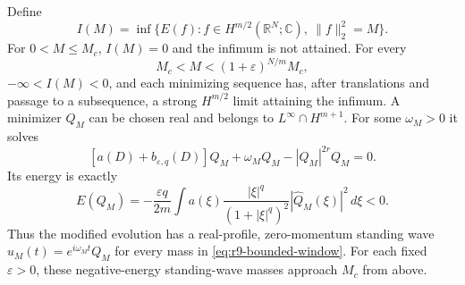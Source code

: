 \begin{theorem}
\label{thm:r9-bounded-boundary}
Define
\[
 I(M)=\inf\{E(f): f\in H^{m/2}(\mathbb R^N;\mathbb C),\ \|f\|_2^2=M\}.
\]
For $0<M\le M_c$, $I(M)=0$ and the infimum is not attained.
For every
\begin{equation}\label{eq:r9-bounded-window}
 M_c<M<(1+\varepsilon)^{N/m}M_c,
\end{equation}
$-\infty<I(M)<0$, and each minimizing sequence has, after translations
and passage to a subsequence, a strong $H^{m/2}$ limit attaining the
infimum. A minimizer $Q_M$ can be chosen real and belongs to
$L^\infty\cap H^{m+1}$. For some $\omega_M>0$ it solves
\begin{equation}\label{eq:r9-bounded-profile}
 [a(D)+b_{\varepsilon,q}(D)]Q_M+\omega_M Q_M
       -|Q_M|^{2r}Q_M=0.
\end{equation}
Its energy is exactly
\begin{equation}\label{eq:r9-bounded-energy}
 E(Q_M)=-\frac{\varepsilon q}{2m}
 \int a(\xi)\frac{|\xi|^q}{(1+|\xi|^q)^2}
             |\widehat Q_M(\xi)|^2\,d\xi<0.
\end{equation}
Thus the modified evolution has a real-profile, zero-momentum standing
wave $u_M(t)=e^{i\omega_Mt}Q_M$ for every mass in
\eqref{eq:r9-bounded-window}. For each fixed $\varepsilon>0$, these
negative-energy standing-wave masses approach $M_c$ from above.
\end{theorem}

